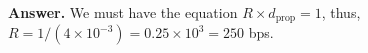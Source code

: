 
\textbf{Answer.} We must have the equation \(R \times d_{\text{prop}}
= 1\), thus, \(R = 1/(4 \times 10^{-3}) = 0.25 \times 10^{3} = 250\)
bps.
